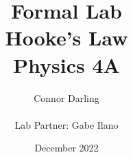 \usepackage[utf8]{inputenc}

\title{\Huge Formal Lab\\
{\huge Hooke's Law\\
{\Large Physics 4A}}}
\author{
  \Large Connor Darling\\\\
  \normalsize Lab Partner: Gabe Ilano
}
\date{December 2022}



\maketitle

\tableofcontents











